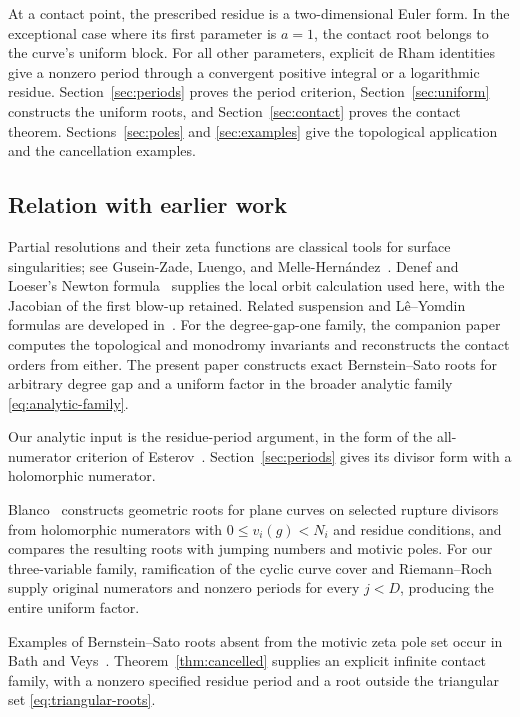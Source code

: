 \documentclass[11pt]{article}
\numberwithin{equation}{section}
\theoremstyle{definition}
\theoremstyle{remark}
\begin{document}
At a contact point, the prescribed residue is a two-dimensional
Euler form. In the exceptional case where its first parameter
is $a=1$, the contact root belongs to the curve's uniform block.
For all other parameters, explicit de Rham identities give a
nonzero period through a convergent positive integral or a
logarithmic residue.
Section~\ref{sec:periods} proves the period criterion,
Section~\ref{sec:uniform} constructs the uniform roots, and
Section~\ref{sec:contact} proves the contact theorem.
Sections~\ref{sec:poles} and \ref{sec:examples} give the
topological application and the cancellation examples.

\subsection*{Relation with earlier work}

Partial resolutions and their zeta functions are classical
tools for surface singularities; see Gusein-Zade, Luengo, and
Melle-Hern\'andez~\cite{GLM97}. Denef and Loeser's Newton
formula~\cite{DL92} supplies the local orbit calculation used
here, with the Jacobian of the first blow-up retained. Related
suspension and L\^e--Yomdin formulas are developed
in~\cite{AGGL26}. For the degree-gap-one family, the companion
paper~\cite{Jiang26} computes the topological and monodromy
invariants and reconstructs the contact orders from either.
The present paper constructs exact Bernstein--Sato roots for
arbitrary degree gap and a uniform factor in the broader
analytic family \eqref{eq:analytic-family}.

Our analytic input is the residue-period argument, in the form
of the all-numerator criterion of Esterov~\cite[Lemma~7.3]{Est26}.
Section~\ref{sec:periods} gives its divisor form with a
holomorphic numerator.

Blanco~\cite[Theorem~B and Proposition~C]{Bla26} constructs
geometric roots for plane curves on selected rupture divisors
from holomorphic numerators with $0\le v_i(g)<N_i$ and
residue conditions, and compares the resulting roots with
jumping numbers and motivic poles.
For our three-variable family, ramification of the cyclic curve
cover and Riemann--Roch supply original numerators and
nonzero periods for every $j<D$, producing the entire
uniform factor.

Examples of Bernstein--Sato roots absent from the motivic
zeta pole set occur in Bath and Veys~\cite[Example~2.13]{BV26}.
Theorem~\ref{thm:cancelled} supplies an explicit infinite
contact family, with a nonzero specified residue period and
a root outside the triangular set \eqref{eq:triangular-roots}.
\end{document}
